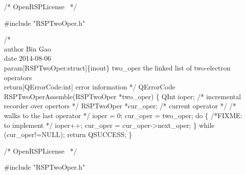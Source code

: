 \nwendcode{}\endmoddef
/*
  \LA{}OpenRSPLicense~{\nwtagstyle{}}\RA{}
*/

#include "RSPTwoOper.h"

/*%
    \\author Bin Gao
    \\date 2014-08-06
    \\param[RSPTwoOper:struct]\{inout\} two_oper the linked list of two-electron operators
    \\return[QErrorCode:int] error information
*/
QErrorCode RSPTwoOperAssemble(RSPTwoOper *two_oper)
\{
    QInt ioper;            /* incremental recorder over opertors */
    RSPTwoOper *cur_oper;  /* current operator */
    /* walks to the last operator */
    ioper = 0;
    cur_oper = two_oper;
    do \{
        /*FIXME: to implement */
        ioper++;
        cur_oper = cur_oper->next_oper;
    \} while (cur_oper!=NULL);
    return QSUCCESS;
\}

\nwendcode{}\endmoddef
/*
  \LA{}OpenRSPLicense~{\nwtagstyle{}}\RA{}
*/

#include "RSPTwoOper.h"


